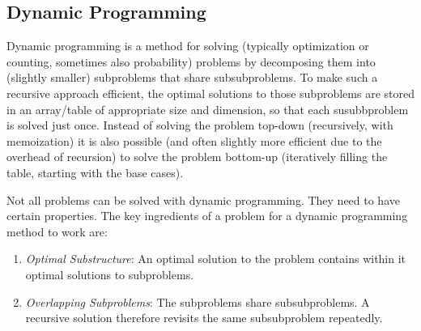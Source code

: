 \subsection{Dynamic Programming}\label{sec:dynamic_programming}

Dynamic programming is a method for solving (typically optimization or counting, sometimes also probability) problems by decomposing them into (slightly smaller) subproblems that share subsubproblems.
To make such a recursive approach efficient, the optimal solutions to those subproblems are stored in an array/table of appropriate size and dimension, so that each susubbproblem is solved just once.
Instead of solving the problem top-down (recursively, with memoization) it is also possible (and often slightly more efficient due to the overhead of recursion) to solve the problem bottom-up (iteratively filling the table, starting with the base cases).




Not all problems can be solved with dynamic programming. 
They need to have certain properties.
The key ingredients of a problem for a dynamic programming method to work are:
\begin{enumerate}
  \item \emph{Optimal Substructure}:  \label{optimal_substructure_dp}
  An optimal solution to the problem contains within it optimal solutions to subproblems.
  \item \emph{Overlapping Subproblems}: \label{overlapping_subproblems}
  The subproblems share subsubproblems.
  A recursive solution therefore revisits the same subsubproblem repeatedly.
\end{enumerate}



